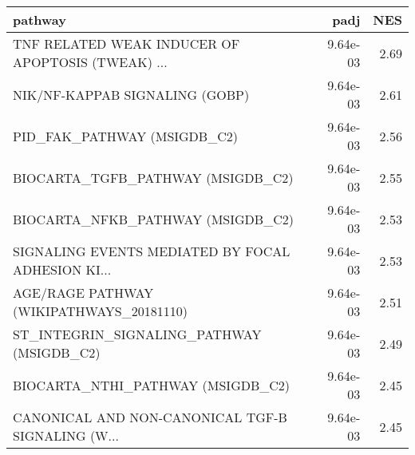 \begin{tabular}{lrr}
\toprule
                                           pathway &      padj &   NES \\
\midrule
 TNF RELATED WEAK INDUCER OF APOPTOSIS (TWEAK) ... &  9.64e-03 &  2.69 \\
                    NIK/NF-KAPPAB SIGNALING (GOBP) &  9.64e-03 &  2.61 \\
                       PID\_FAK\_PATHWAY (MSIGDB\_C2) &  9.64e-03 &  2.56 \\
                 BIOCARTA\_TGFB\_PATHWAY (MSIGDB\_C2) &  9.64e-03 &  2.55 \\
                 BIOCARTA\_NFKB\_PATHWAY (MSIGDB\_C2) &  9.64e-03 &  2.53 \\
 SIGNALING EVENTS MEDIATED BY FOCAL ADHESION KI... &  9.64e-03 &  2.53 \\
          AGE/RAGE PATHWAY (WIKIPATHWAYS\_20181110) &  9.64e-03 &  2.51 \\
         ST\_INTEGRIN\_SIGNALING\_PATHWAY (MSIGDB\_C2) &  9.64e-03 &  2.49 \\
                 BIOCARTA\_NTHI\_PATHWAY (MSIGDB\_C2) &  9.64e-03 &  2.45 \\
 CANONICAL AND NON-CANONICAL TGF-B SIGNALING (W... &  9.64e-03 &  2.45 \\
\bottomrule
\end{tabular}
